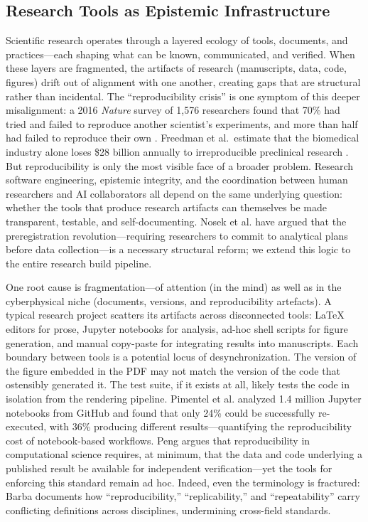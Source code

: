 \documentclass[
]{article}
\begin{document}
\subsection{Research Tools as Epistemic
Infrastructure}\label{research-tools-as-epistemic-infrastructure}

Scientific research operates through a layered ecology of tools,
documents, and practices---each shaping what can be known, communicated,
and verified. When these layers are fragmented, the artifacts of
research (manuscripts, data, code, figures) drift out of alignment with
one another, creating gaps that are structural rather than incidental.
The ``reproducibility crisis'' is one symptom of this deeper
misalignment: a 2016 \emph{Nature} survey of 1,576 researchers found
that 70\% had tried and failed to reproduce another scientist's
experiments, and more than half had failed to reproduce their own
\citep{baker2016reproducibility}. Freedman et al.~estimate that the
biomedical industry alone loses \$28 billion annually to irreproducible
preclinical research \citep{freedman2015economics}. But reproducibility
is only the most visible face of a broader problem. Research software
engineering, epistemic integrity, and the coordination between human
researchers and AI collaborators all depend on the same underlying
question: whether the tools that produce research artifacts can
themselves be made transparent, testable, and self-documenting. Nosek et
al. \citep{nosek2018preregistration} have argued that the
preregistration revolution---requiring researchers to commit to
analytical plans before data collection---is a necessary structural
reform; we extend this logic to the entire research build pipeline.

One root cause is fragmentation---of attention (in the mind) as well as
in the cyberphysical niche (documents, versions, and reproducibility
artefacts). A typical research project scatters its artifacts across
disconnected tools: LaTeX editors \citep{lamport1994latex} for prose,
Jupyter notebooks for analysis, ad-hoc shell scripts for figure
generation, and manual copy-paste for integrating results into
manuscripts. Each boundary between tools is a potential locus of
desynchronization. The version of the figure embedded in the PDF may not
match the version of the code that ostensibly generated it. The test
suite, if it exists at all, likely tests the code in isolation from the
rendering pipeline. Pimentel et al. \citep{pimentel2019jupyter} analyzed
1.4 million Jupyter notebooks from GitHub and found that only 24\% could
be successfully re-executed, with 36\% producing different
results---quantifying the reproducibility cost of notebook-based
workflows. Peng \citep{peng2011reproducible} argues that reproducibility
in computational science requires, at minimum, that the data and code
underlying a published result be available for independent
verification---yet the tools for enforcing this standard remain ad hoc.
Indeed, even the terminology is fractured: Barba
\citep{barba2018terminologies} documents how ``reproducibility,''
``replicability,'' and ``repeatability'' carry conflicting definitions
across disciplines, undermining cross-field standards.
\end{document}

